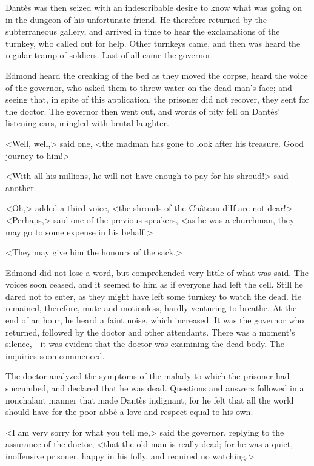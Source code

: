  Dantès was then seized with an indescribable desire to know what was going on in the dungeon of his unfortunate friend. He therefore returned by the subterraneous gallery, and arrived in time to hear the exclamations of the turnkey, who called out for help. Other turnkeys came, and then was heard the regular tramp of soldiers. Last of all came the governor. 

 Edmond heard the creaking of the bed as they moved the corpse, heard the voice of the governor, who asked them to throw water on the dead man's face; and seeing that, in spite of this application, the prisoner did not recover, they sent for the doctor. The governor then went out, and words of pity fell on Dantès' listening ears, mingled with brutal laughter. 

 <Well, well,> said one, <the madman has gone to look after his treasure. Good journey to him!> 

 <With all his millions, he will not have enough to pay for his shroud!> said another. 

 <Oh,> added a third voice, <the shrouds of the Château d'If are not dear!>  <Perhaps,> said one of the previous speakers, <as he was a churchman, they may go to some expense in his behalf.> 

 <They may give him the honours of the sack.> 

 Edmond did not lose a word, but comprehended very little of what was said. The voices soon ceased, and it seemed to him as if everyone had left the cell. Still he dared not to enter, as they might have left some turnkey to watch the dead. He remained, therefore, mute and motionless, hardly venturing to breathe. At the end of an hour, he heard a faint noise, which increased. It was the governor who returned, followed by the doctor and other attendants. There was a moment's silence,—it was evident that the doctor was examining the dead body. The inquiries soon commenced. 

 The doctor analyzed the symptoms of the malady to which the prisoner had succumbed, and declared that he was dead. Questions and answers followed in a nonchalant manner that made Dantès indignant, for he felt that all the world should have for the poor abbé a love and respect equal to his own. 

 <I am very sorry for what you tell me,> said the governor, replying to the assurance of the doctor, <that the old man is really dead; for he was a quiet, inoffensive prisoner, happy in his folly, and required no watching.> 

